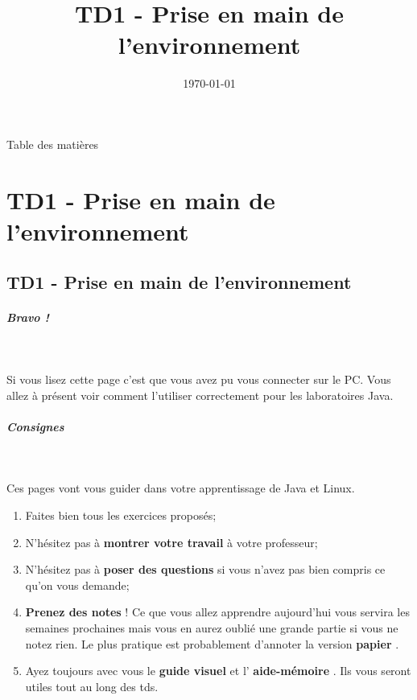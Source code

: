 \documentclass[11pt,a4paper]{article}
\title{TD1 - Prise en main de l'environnement}
\author{}
\date{\today}
\begin{document}
				
				\maketitle
				\clearpage
                {Table des mati\`eres}
                \tableofcontents
                
                \pagestyle{headings}
            
					\clearpage
				
			
		\section{TD1 - Prise en main de l'environnement} 
		\label{TD1index.tex}
			
			
		\subsection{TD1 - Prise en main de l'environnement} 
		\label{TD1unitTD1.tex}
			
			
		\subparagraph{Bravo !} 
		
					\textcolor{white}{.} \par
				
            \par
        
Si vous lisez cette page c'est que vous avez pu vous connecter sur  le PC.
Vous allez \`a pr\'esent voir comment l'utiliser correctement  pour les laboratoires Java.

			
		\subparagraph{Consignes} 
		
					\textcolor{white}{.} \par
				
            \par
        
Ces pages vont vous guider dans votre apprentissage de Java et Linux.

					\begin{enumerate}
				
			\item 
	Faites bien tous les exercices propos\'es;
			\item N'h\'esitez pas \`a  \textbf{montrer votre travail}  \`a votre professeur;
			\item N'h\'esitez pas \`a  \textbf{poser des questions}  si vous n'avez pas bien compris ce qu'on vous demande;
			\item  \textbf{Prenez des notes} ! Ce que vous allez apprendre aujourd'hui vous servira les semaines prochaines mais vous en aurez oubli\'e une grande partie si vous ne notez rien. Le plus pratique est probablement d'annoter la version  \textbf{papier} .
			\item Ayez toujours avec vous le  \textbf{guide visuel } et l' \textbf{aide-m\'emoire} . Ils vous seront utiles tout au long des tds.
					\end{enumerate}
				
\end{document}

